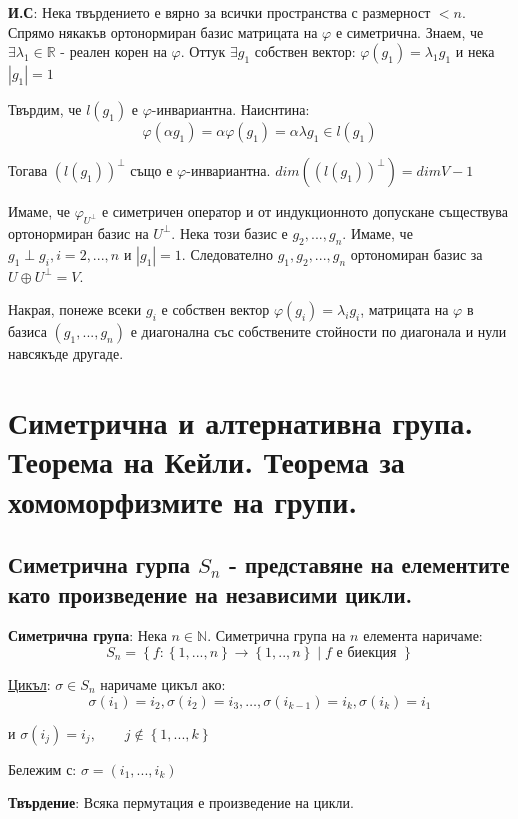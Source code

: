 \documentclass{article}
\renewcommand{\\}{\newline}
\newcommand{\sep}{\;|\;}
\begin{document}
\textbf{И.С}: Нека твърдението е вярно за всички пространства с размерност \(< n\). Спрямо някакъв ортонормиран базис матрицата на \(\varphi\) е симетрична. Знаем, че \(\exists \lambda_1 \in \mathbb{R}\) - реален корен на \(\varphi\). Оттук \(\exists g_1\) собствен вектор: \(\varphi(g_1) = \lambda_1 g_1\) и нека \(\left|g_1\right| = 1\)       

Твърдим, че \(l(g_1)\) е \(\varphi\)-инвариантна. Наиснтина: \[
  \varphi(\alpha g_1) = \alpha \varphi(g_1) = \alpha \lambda g_1 \in l(g_1)
\] 

Тогава \(\left(l(g_1)\right)^{\perp}\) също е \(\varphi\)-инвариантна. \(dim(\left(l(g_1)\right)^{\perp}) = dimV - 1\)    

Имаме, че \(\varphi_{U^{\perp}}\) е симетричен оператор и от индукционното допускане съществува ортонормиран базис на \(U^{\perp}\). Нека този базис е \(g_2, ..., g_{n}\). Имаме, че \(g_{1} \perp g_{i}, i = 2, ..., n\) и \(\left|g_1\right| = 1\). Следователно \(g_1, g_2, ..., g_n\) ортономиран базис за \(U \oplus U^{\perp} = V\).

Накрая, понеже всеки \(g_i\) е собствен вектор \(\varphi(g_i) = \lambda_i g_i\), матрицата на \(\varphi\) в базиса \((g_1, ..., g_n)\) е диагонална със собствените стойности по диагонала и нули навсякъде другаде.    
\newpage
\section{Симетрична и алтернативна група. Теорема на Кейли. Теорема за хомоморфизмите на групи.}

\subsection{Симетрична гурпа \(S_n\) - представяне на елементите като произведение на независими цикли.}

\textbf{Симетрична група}: Нека \(n \in \mathbb{N}\). Симетрична група на \(n\) елемента наричаме: \[
  S_n = \left\{f: \left\{1,...,n\right\} \to \left\{1,..,n\right\} \sep f \text{ е биекция }\right\}
\]   

\underline{Цикъл}: \(\sigma \in S_n\) наричаме цикъл ако:\[
  \sigma(i_1) = i_2, \sigma(i_2) = i_3, \ldots, \sigma(i_{k-1}) = i_k, \sigma(i_k) = i_1
\]        

и \(\sigma(i_j) = i_j,\qquad j \not\in \left\{1,...,k\right\}\)  

Бележим с: \(\sigma = (i_1, ..., i_k)\)  

\textbf{Твърдение}: Всяка пермутация е произведение на цикли.
\end{document}
